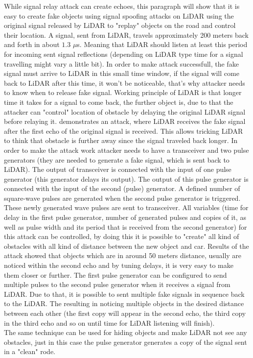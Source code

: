 While signal relay attack can create echoes, this paragraph will show that it is easy to create fake objects using signal spoofing attacks on \gls{LiDAR} using the original signal released by \gls{LiDAR} to "replay" objects on the road and control their location.
A signal, sent from \gls{LiDAR}, travels approximately 200 meters back and forth in about $1.3$ $\mu$s. Meaning that \gls{LiDAR} should listen at least this period for incoming sent signal reflections (depending on \gls{LiDAR} type time for a signal travelling might vary a little bit). In order to make attack successfull, the fake signal must arrive to \gls{LiDAR} in this small time window, if the signal will come back to \gls{LiDAR} after this time, it won't be noticeable, that's why attacker needs to know when to release fake signal. Working principle of \gls{LiDAR} is that longer time it takes for a signal to come back, the further object is, due to that the attacker can "control" location of obstacle by delaying the original \gls{LiDAR} signal before relaying it. \cite{AttacksOnSensors} demonstrates an attack, where \gls{LiDAR} receives the fake signal after the first echo of the original signal is received. This allows tricking \gls{LiDAR} to think that obstacle is further away since the signal traveled back longer. In order to make the attack work attacker needs to have a transceiver and two pulse generators (they are needed to generate a fake signal, which is sent back to \gls{LiDAR}). The output of transceiver is connected with the input of one pulse generator (this generator delays its output). The output of this pulse generator is connected with the input of the second (pulse) generator. A defined number of square-wave pulses are generated when the second pulse generator is triggered. These newly generated wave pulses are sent to transceiver.  All variables (time for delay in the first pulse generator, number of generated pulses and copies of it, as well as pulse width and its period that is received from the second generator) for this attack can be controlled, by doing this it is possible to "create" all kind of obstacles with all kind of distance between the new object and car. Results of the attack showed that objects which are in around 50 meters distance, usually are noticed within the second echo and by tuning delays, it is very easy to make them closer or further. The first pulse generator can be configured to send multiple pulses to the second pulse generator when it receives a signal from \gls{LiDAR}. Due to that, it is possible to sent multiple fake signals in sequence back to the \gls{LiDAR}. The resulting in noticing multiple objects in the desired distance between each other (the first copy will appear in the second echo, the third copy in the third echo and so on until time for \gls{LiDAR} listening will finish).\\
The same technique can be used for hiding objects and make \gls{LiDAR} not see any obstacles, just in this case the pulse generator generates a copy of the signal sent in a "clean" rode.

